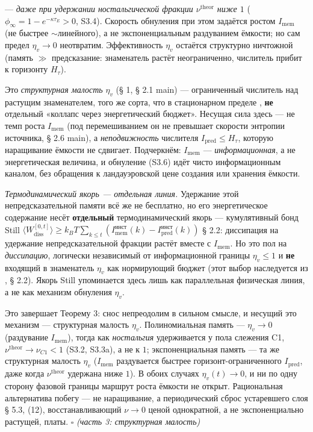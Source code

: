 \documentclass[12pt]{iopart}
\begin{document}
--- \emph{даже при удержании ностальгической фракции \(\nu^{\text{theor}}\) ниже \(1\)} (\(\phi_\infty = 1-e^{-\kappa\tau_E} > 0\), S3.4). Скорость обнуления при этом задаётся ростом \(I_{\text{mem}}\) (не быстрее \(\sim\)линейного), а не экспоненциальным раздуванием ёмкости; но сам предел \(\eta_v \to 0\) неотвратим. Эффективность \(\eta_v\) остаётся структурно ничтожной (память \(\gg\) предсказание: знаменатель растёт неограниченно, числитель прибит к горизонту \(H_\tau\)).



Это \emph{структурная малость} \(\eta_v\) (§ 1, § 2.1 main) --- ограниченный числитель над растущим знаменателем, того же сорта, что в стационарном пределе \cite{Andriishin2026b}, \textbf{не} отдельный «коллапс через энергетический бюджет». Несущая сила здесь --- не темп роста \(I_{\text{mem}}\) (под перемешиванием он не превышает скорости энтропии источника, § 2.6 main), а \emph{неподвижность} числителя \(I_{\text{pred}} \le H_\tau\), которую наращивание ёмкости не сдвигает. Подчеркнём: \(I_{\text{mem}}\) --- \emph{информационная}, а не энергетическая величина, и обнуление (S3.6) идёт чисто информационным каналом, без обращения к ландауэровской цене создания или хранения ёмкости.



\emph{Термодинамический якорь --- отдельная линия.} Удержание этой непредсказательной памяти всё же не бесплатно, но его энергетическое содержание несёт \textbf{отдельный} термодинамический якорь --- кумулятивный бонд Still \(\langle W_{\text{diss}}^{[0,t]}\rangle \ge k_B T\sum_{k\le t}(I_{\text{mem}}^{\text{инст}}(k) - I_{\text{pred}}^{\text{инст}}(k))\) \cite{Still2012,Andriishin2026b} § 2.2: диссипация на удержание непредсказательной фракции растёт вместе с \(I_{\text{mem}}\). Но это пол на \emph{диссипацию}, логически независимый от информационной границы \(\eta_v \le 1\) и \textbf{не} входящий в знаменатель \(\eta_v\) как нормирующий бюджет (этот выбор наследуется из \cite{Andriishin2026b}, § 2.2). Якорь Still упоминается здесь лишь как параллельная физическая линия, а не как механизм обнуления \(\eta_v\).



Это завершает Теорему 3: снос непреодолим в сильном смысле, и несущий это механизм --- структурная малость \(\eta_v\). Полиномиальная память --- \(\eta_v \to 0\) (раздувание \(I_{\text{mem}}\)), тогда как \emph{ностальгия} удерживается у пола слежения C1, \(\nu^{\text{theor}} \to \nu_{C1} < 1\) (S3.2, S3.3a), а не к \(1\); экспоненциальная память --- та же структурная малость \(\eta_v\) (\(I_{\text{mem}}\) раздувается быстрее горизонт-ограниченного \(I_{\text{pred}}\), даже когда \(\nu^{\text{theor}}\) удержана ниже \(1\)). В обоих случаях \(\eta_v(t) \to 0\), и ни по одну сторону фазовой границы маршрут роста ёмкости не открыт. Рациональная альтернатива побегу --- не наращивание, а периодический сброс устаревшего слоя \cite{Andriishin2026b} § 5.3, (12), восстанавливающий \(\nu \to 0\) ценой однократной, а не экспоненциально растущей, платы. \(\square\) \emph{(часть 3: структурная малость)}
\end{document}
